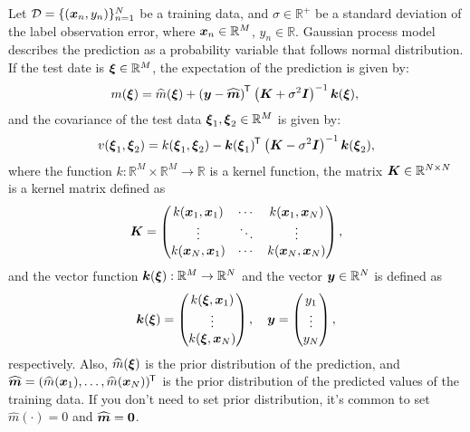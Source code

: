\documentclass[twocolumn,a4paper,10pt]{article}
\begin{document}
Let $\mathcal{D} = \{(\boldsymbol{x}_n, y_n)\}_{n=1}^{N}$ be a training data, and $\sigma \in \mathbb{R}^{+}$
be a standard deviation of the label observation error, where $\boldsymbol{x}_n \in \mathbb{R}^M$, $y_n \in \mathbb{R}$.
Gaussian process model describes the prediction as a probability variable that follows normal distribution.
If the test date is $\boldsymbol{\xi} \in \mathbb{R}^M$, the expectation of the prediction is given by:
\begin{equation}
    m (\boldsymbol{\xi}) = \widehat{m} (\boldsymbol{\xi}) + \left( \boldsymbol{y} - \widehat{\boldsymbol{m}} \right)^{\mkern-1.5mu\mathsf{T}}\hspace{0.5pt}
    \left (\boldsymbol{K} + \sigma^2 \boldsymbol{I} \right)^{-1} \boldsymbol{k} (\boldsymbol{\xi}),
    \label{eqn:gp_exp} \\
\end{equation}
and the covariance of the test data $\boldsymbol{\xi}_1, \boldsymbol{\xi}_2 \in \mathbb{R}^M$ is given by:
\begin{equation}
    v (\boldsymbol{\xi}_1, \boldsymbol{\xi}_2) = k (\boldsymbol{\xi}_1, \boldsymbol{\xi}_2)
    - \boldsymbol{k} (\boldsymbol{\xi}_1)^{\mkern-1.5mu\mathsf{T}}\hspace{0.5pt} \left( \boldsymbol{K} - \sigma^2 \boldsymbol{I} \right)^{-1} \boldsymbol{k} (\boldsymbol{\xi}_2),
    \label{eqn:gp_cov}
\end{equation}
where the function $k: \mathbb{R}^M \times \mathbb{R}^M \to \mathbb{R}$ is a kernel function,
the matrix $\boldsymbol{K} \in \mathbb{R}^{N \times N}$ is a kernel matrix defined as
\begin {equation}
    \boldsymbol{K} = \begin{pmatrix}
        k (\boldsymbol{x}_1, \boldsymbol{x}_1) & \cdots & k (\boldsymbol{x}_1, \boldsymbol{x}_N) \\
        \vdots & \ddots & \vdots \\
        k (\boldsymbol{x}_N, \boldsymbol{x}_1) & \cdots & k (\boldsymbol{x}_N, \boldsymbol{x}_N) \\
    \end{pmatrix},
\end{equation}
and the vector function $\boldsymbol{k} (\boldsymbol{\xi}): \mathbb{R}^M \to \mathbb{R}^N$ and
the vector $\boldsymbol{y} \in \mathbb{R}^N$ is defined as
\begin{equation}
    \boldsymbol{k} (\boldsymbol{\xi}) = \begin{pmatrix}
        k (\boldsymbol{\xi}, \boldsymbol{x}_1) \\
        \vdots \\
        k (\boldsymbol{\xi}, \boldsymbol{x}_N) \\
    \end{pmatrix},
    \hspace{10pt}
    \boldsymbol{y} = \begin{pmatrix}
        y_1 \\ \vdots \\ y_N \\
    \end{pmatrix},
\end{equation}
respectively.
Also, $\widehat{m} (\boldsymbol{\xi})$ is the prior distribution of the prediction, and
$\widehat{\boldsymbol{m}} = (\widehat{m} (\boldsymbol{x}_1), \ldots, \widehat{m} (\boldsymbol{x}_N))^{\mkern-1.5mu\mathsf{T}}\hspace{0.5pt}$ is
the prior distribution of the predicted values of the training data. If you don't need to set
prior distribution, it's common to set $\widehat{m} (\cdot) = 0$ and $\widehat{\boldsymbol{m}} = \boldsymbol{0}$.
\end{document}
